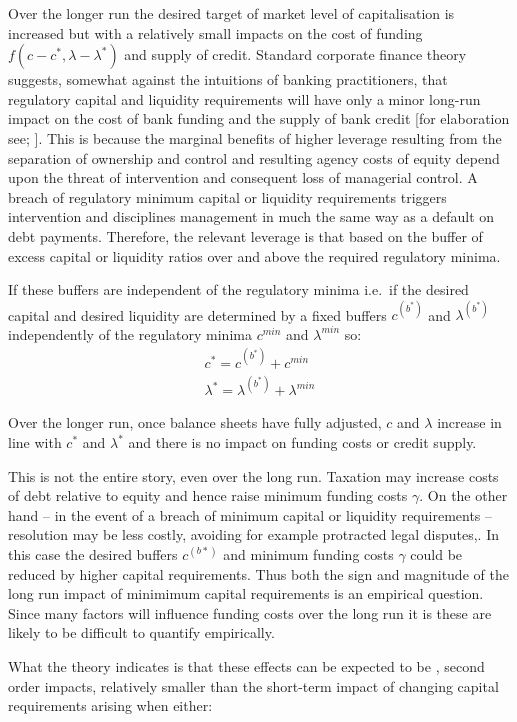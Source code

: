 \documentclass[
]{article}
\begin{document}
Over the longer run the desired target of market level of capitalisation is increased but with a relatively small impacts on the cost of funding \(f(c-c^\ast,\lambda-\lambda^\ast)\) and supply of credit. Standard corporate finance theory suggests, somewhat against the intuitions of banking practitioners, that regulatory capital and liquidity requirements will have only a minor long-run impact on the cost of bank funding and the supply of bank credit {[}for elaboration see; \citet{hellwig2014bankers}{]}. This is because the marginal benefits of higher leverage resulting from the separation of ownership and control and resulting agency costs of equity depend upon the threat of intervention and consequent loss of managerial control. A breach of regulatory minimum capital or liquidity requirements triggers intervention and disciplines management in much the same way as a default on debt payments. Therefore, the relevant leverage is that based on the buffer of excess capital or liquidity ratios over and above the required regulatory minima.

If these buffers are independent of the regulatory minima i.e.~if the desired capital and desired liquidity are determined by a fixed buffers \(c^{(b^*)}\) and \(\lambda^{(b^*)}\) independently of the regulatory minima \(c^{min}\) and \(\lambda^{min}\) so:
\[
\begin{split}
c^*=c^{(b^*)}+c^{min} \\
\lambda^\ast=\lambda^{(b^*)}+\lambda^{min} 
\end{split}
\]

Over the longer run, once balance sheets have fully adjusted, \(c\) and \(\lambda\) increase in line with \(c^\ast\) and \(\lambda^\ast\) and there is no impact on funding costs or credit supply.

This is not the entire story, even over the long run. Taxation may increase costs of debt relative to equity and hence raise minimum funding costs \(\gamma\). On the other hand -- in the event of a breach of minimum capital or liquidity requirements -- resolution may be less costly, avoiding for example protracted legal disputes,. In this case the desired buffers \(c^(b*)\) and minimum funding costs \(\gamma\) could be reduced by higher capital requirements. Thus both the sign and magnitude of the long run impact of minimimum capital requirements is an empirical question. Since many factors will influence funding costs over the long run it is these are likely to be difficult to quantify empirically.

What the theory indicates is that these effects can be expected to be , second order impacts, relatively smaller than the short-term impact of changing capital requirements arising when either:
\end{document}
